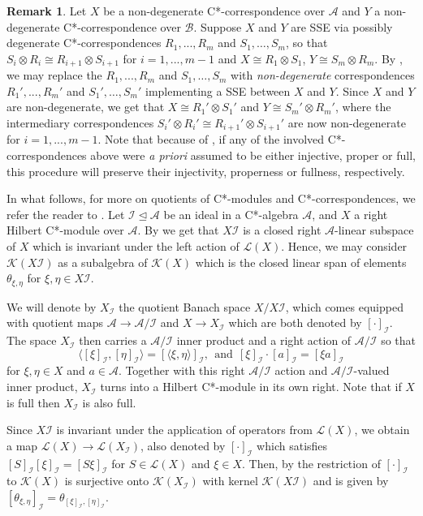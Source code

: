 \documentclass[11pt, letterpaper,final]{amsart}
\newcommand{\A}{{\mathcal{A}}}
\newcommand{\B}{{\mathcal{B}}}
\newcommand{\I}{{\mathcal{I}}}
\newcommand{\K}{{\mathcal{K}}}
\renewcommand{\L}{{\mathcal{L}}}
\theoremstyle{definition}
\newtheorem{rmk}[thm]{Remark}
\begin{document}
\begin{rmk}
Let $X$ be a non-degenerate C*-correspondence over $\A$ and $Y$ a non-degenerate C*-correspondence over $\B$.  Suppose $X$ and $Y$ are SSE via possibly degenerate C*-correspon\-dences $R_1,..., R_m$ and $S_1, \ldots, S_m$, so that $S_i \otimes R_i \cong R_{i+1} \otimes S_{i+1}$ for $i=1,...,m-1$ and $X\cong R_1 \otimes S_1$, $Y \cong S_m \otimes R_m$.  By \cite[Lemma~3.10]{MPT08}, we may replace the $R_1,..., R_m$ and $S_1, \ldots, S_m$ with \emph{non-degenerate} correspondences $R_1',..., R_m'$ and $S_1', \ldots, S_m'$ implementing a SSE between $X$ and $Y$. Since $X$ and $Y$ are non-degenerate, we get that $X \cong R_1' \otimes S_1'$ and $Y\cong S_m' \otimes R_m'$, where the intermediary correspondences $S_i'\otimes R_i' \cong R_{i+1}' \otimes S_{i+1}'$ are now non-degenerate for $i=1,...,m-1$. Note that because of \cite[Lemma~3.10]{MPT08}, if any of the involved C*-correspondences above were \textit{a priori} assumed to be either injective, proper or full, this procedure will preserve their injectivity, properness or fullness, respectively.
\end{rmk}

In what follows, for more on quotients of C*-modules and C*-correspondences, we refer the reader to \cite{FMR-IUMJ2003, KatII}. Let $\I \unlhd \A$ be an ideal in a C*-algebra $\A$, and $X$ a right Hilbert C*-module over $\A$. By \cite[Corollary 1.4]{KatII} we get that $X\I$ is a closed right $\A$-linear subspace of $X$ which is invariant under the left action of $\L(X)$. Hence, we may consider $\K(X\I)$ as a subalgebra of $\K(X)$ which is the closed linear span of elements $\theta_{\xi,\eta}$ for $\xi,\eta \in X\I$.

We will denote by $X_\I$ the quotient Banach space $X/X\I$, which comes equipped with quotient maps $\A \rightarrow \A / \I$ and $X \rightarrow X_\I$ which are both denoted by $[\cdot]_{\I}$. The space $X_{\I}$ then carries a $\A/\I$ inner product and a right action of $\A/\I$ so that
$$
\langle[\xi]_{\I},[\eta]_{\I} \rangle = [\langle \xi,\eta \rangle]_{\I}, \ \ \text{and} \ \ [\xi]_{\I} \cdot [a]_{\I} = [\xi a]_{\I}
$$
for $\xi,\eta \in X$ and $a\in \A$. Together with this right $\A/ \I$ action and $\A/\I$-valued inner product, $X_{\I}$ turns into a Hilbert C*-module in its own right. Note that if $X$ is full then $X_{\I}$ is also full.

Since $X\I$ is invariant under the application of operators from $\L(X)$, we obtain a map $\L(X) \rightarrow \L(X_\I)$, also denoted by $[\cdot]_{\I}$ which satisfies $[S]_{\I}[\xi]_{\I} = [S\xi]_{\I}$ for $S\in \L(X)$ and $\xi \in X$. Then, by \cite[Lemma 1.6]{KatII} the restriction of $[\cdot]_{\I}$ to $\K(X)$ is surjective onto $\K(X_{\I})$ with kernel $\K(X\I)$ and is given by $[\theta_{\xi,\eta}]_{\I} = \theta_{[\xi]_{\I},[\eta]_{\I}}$.
\end{document}
